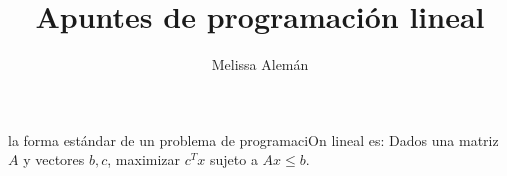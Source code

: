 \documentclass{article}
\title{Apuntes de programación lineal}
\author{Melissa Alemán}
\begin{document}
\maketitle

la forma estándar de un problema de programaciOn lineal es: Dados una
matriz $A$ y vectores $b,c$, maximizar $c^Tx$ sujeto a $Ax\leq b$.
\end{document}
